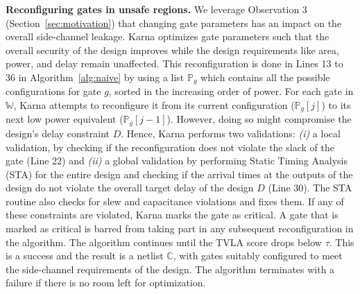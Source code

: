  
{\flushleft \bf Reconfiguring gates in unsafe regions.}
We leverage Observation 3 (Section~\ref{sec:motivation}) that changing gate parameters has an impact on the overall side-channel leakage. {\sf Karna} optimizes gate parameters such that the overall security of the design improves while the design requirements like area, power, and delay remain unaffected. This reconfiguration is done in Lines 13 to 36 in Algorithm~\ref{alg:naive} by using a list $\mathbb P_{g}$ which contains all the possible configurations for gate $g$, sorted in the increasing order of power.
For each gate in $\mathbb W$, {\sf Karna} attempts to reconfigure it from its current configuration ($\mathbb P_g[j]$) to its next low power equivalent ($\mathbb P_g[j-1]$). However, doing so might compromise the design's delay constraint $D$. Hence, {\sf Karna} performs two validations: {\em (i)} a local validation, by checking if the reconfiguration does not violate the slack of the gate (Line 22) and {\em (ii)} a global validation by performing Static Timing Analysis (STA) for the entire design and checking if the arrival times at the outputs of the design do not violate the overall target delay  of the design $D$ (Line 30). The STA routine also checks for slew and capacitance violations and fixes them. If any of these constraints are violated, {\sf Karna} marks the gate as critical. A gate that is marked as critical is barred from taking part in any subsequent reconfiguration in the algorithm. 
The algorithm continues until the TVLA score drops below  $\tau$. This is a success and the result is a netlist $\mathbb C$, with gates suitably configured to meet the side-channel requirements of the design. The algorithm terminates with a failure if there is no room left for optimization. 


